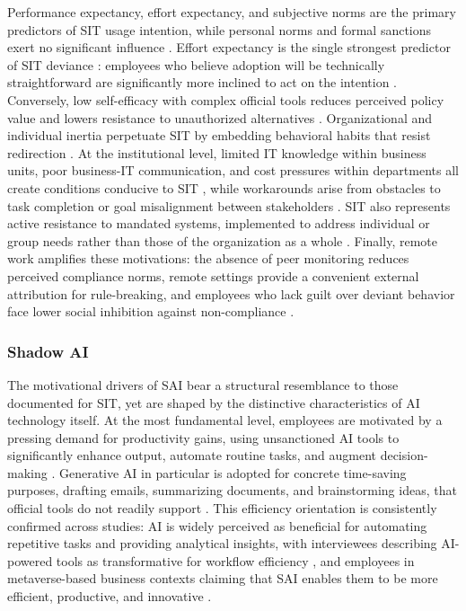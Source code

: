 \documentclass[12pt,oneside]{article}
\begin{document}
Performance expectancy, effort expectancy, and subjective norms are the primary predictors of \ac{SIT} usage intention, while personal norms and formal sanctions exert no significant influence \citep[500]{nguyen2024understanding}. Effort expectancy is the single strongest predictor of \ac{SIT} deviance \citep[510]{nguyen2024understanding}: employees who believe adoption will be technically straightforward are significantly more inclined to act on the intention \citep[506-507]{nguyen2024understanding}. Conversely, low self-efficacy with complex official tools reduces perceived policy value and lowers resistance to unauthorized alternatives \citep[4]{welck2017empowerment}. Organizational and individual inertia perpetuate \ac{SIT} by embedding behavioral habits that resist redirection \citep[114]{silic2019critical}. At the institutional level, limited \ac{IT} knowledge within business units, poor business-\ac{IT} communication, and cost pressures within departments all create conditions conducive to \ac{SIT} \citep[5-7]{furstenau2016shadow}, while workarounds arise from obstacles to task completion or goal misalignment between stakeholders \citep[2]{roeder2014managers}. \ac{SIT} also represents active resistance to mandated systems, implemented to address individual or group needs rather than those of the organization as a whole \citep[3, 5]{magunduni2018revisiting}. Finally, remote work amplifies these motivations: the absence of peer monitoring reduces perceived compliance norms, remote settings provide a convenient external attribution for rule-breaking, and employees who lack guilt over deviant behavior face lower social inhibition against non-compliance \citep[4, 5, 7]{n2023information}.

\subsubsection{Shadow AI}

The motivational drivers of \ac{SAI} bear a structural resemblance to those documented for \ac{SIT}, yet are shaped by the distinctive characteristics of \ac{AI} technology itself. At the most fundamental level, employees are motivated by a pressing demand for productivity gains, using unsanctioned \ac{AI} tools to significantly enhance output, automate routine tasks, and augment decision-making \citep[2, 3]{ross2025shadowai}. Generative \ac{AI} in particular is adopted for concrete time-saving purposes, drafting emails, summarizing documents, and brainstorming ideas, that official tools do not readily support \citep[4]{ross2025shadowai}. This efficiency orientation is consistently confirmed across studies: \ac{AI} is widely perceived as beneficial for automating repetitive tasks and providing analytical insights, with interviewees describing \ac{AI}-powered tools as transformative for workflow efficiency \citep[7, 9]{silic2025shadow}, and employees in metaverse-based business contexts claiming that \ac{SAI} enables them to be more efficient, productive, and innovative \citep[2]{chin2025conflicting}. 
\end{document}
